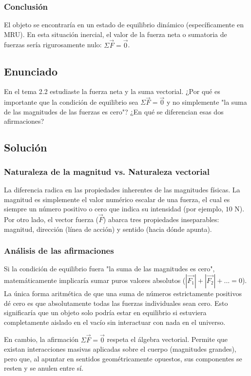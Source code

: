 \documentclass[12pt, a4paper]{article}
\begin{document}
\subsubsection*{Conclusión}
El objeto se encontraría en un estado de equilibrio dinámico (específicamente en MRU). En esta situación inercial, el valor de la fuerza neta o sumatoria de fuerzas sería rigurosamente nulo: $\Sigma\vec{F} = \vec{0}$.

\newpage
\subsection*{Enunciado}
En el tema 2.2 estudiaste la fuerza neta y la suma vectorial. ¿Por qué es importante que la condición de equilibrio sea $\Sigma\vec{F} = \vec{0}$ y no simplemente "la suma de las magnitudes de las fuerzas es cero"? ¿En qué se diferencian esas dos afirmaciones?

\subsection*{Solución}

\subsubsection*{Naturaleza de la magnitud vs. Naturaleza vectorial}
La diferencia radica en las propiedades inherentes de las magnitudes físicas. La magnitud es simplemente el valor numérico escalar de una fuerza, el cual es siempre un número positivo o cero que indica su intensidad (por ejemplo, $10 \text{ N}$). Por otro lado, el vector fuerza ($\vec{F}$) abarca tres propiedades inseparables: magnitud, dirección (línea de acción) y sentido (hacia dónde apunta).

\subsubsection*{Análisis de las afirmaciones}
Si la condición de equilibrio fuera "la suma de las magnitudes es cero", matemáticamente implicaría sumar puros valores absolutos ($|\vec{F_1}| + |\vec{F_2}| + ... = 0$). La única forma aritmética de que una suma de números estrictamente positivos dé cero es que absolutamente todas las fuerzas individuales sean cero. Esto significaría que un objeto solo podría estar en equilibrio si estuviera completamente aislado en el vacío sin interactuar con nada en el universo.

En cambio, la afirmación $\Sigma\vec{F} = \vec{0}$ respeta el álgebra vectorial. Permite que existan interacciones masivas aplicadas sobre el cuerpo (magnitudes grandes), pero que, al apuntar en sentidos geométricamente opuestos, sus componentes se resten y se anulen entre sí. 
\end{document}
